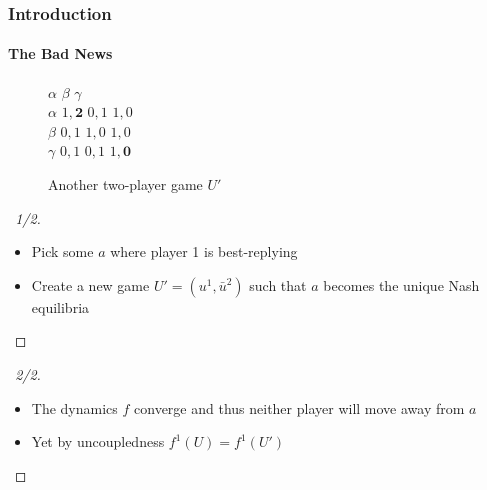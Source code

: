 \documentclass{beamer}
\begin{document}
\begin{frame}
    \frametitle{Introduction}
    \framesubtitle{The Bad News}
    \vspace{-20pt}
    \begin{figure}[h]
    \centering
    \begin{game}{3}{3}
            \>  $\alpha$ \>  $\beta$  \> $\gamma$ \\
         $\alpha$    \> {\color{eth7}$1, \mathbf{2}$} \> $0, 1$ \> $1,0$\\
         $\beta$      \>  $0, 1$ \> $1, 0$ \> $1, 0$\\
         $\gamma$ \>  $0, 1$ \> $0, 1$ \> {\color{eth7}$1, \mathbf{0}$}\\
    \end{game}
    \caption{Another two-player game $U'$}
    \label{fig:example1}
    \end{figure}
    \vspace{-10pt}
    \begin{overprint}
        \begin{proof}[\proofname\ 1/2]
            \let\qed\relax
            \begin{itemize}
                \item Pick some $a$ where player 1 is best-replying
                \item Create a new game $U' = (u^1, \bar{u}^2)$ such that $a$
                    becomes the unique Nash equilibria
            \end{itemize}
        \end{proof}
        \begin{proof}[\proofname\ 2/2]
            \begin{itemize}
                \item The dynamics $f$ converge and thus
                    neither player will move away from $a$
                \item Yet by uncoupledness $f^1(U) = f^1(U')$
            \end{itemize}
        \end{proof}
    \end{overprint}
%
\end{frame}
\end{document}
